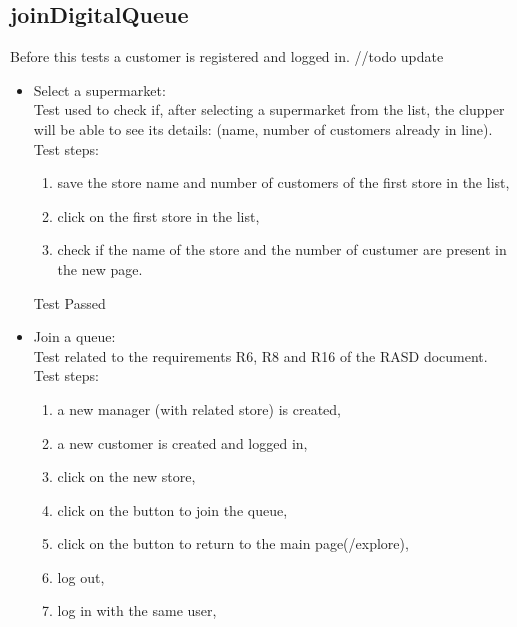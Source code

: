\subsection{joinDigitalQueue}

Before this tests a customer is registered and logged in.
//todo update
\begin{itemize}
    \item Select a supermarket: \\
    Test used to check if, after selecting a supermarket from the list, the clupper will be able to see its details: (name, number of customers already in line).\\
    Test steps:\\

    \begin{enumerate}
        \item save the store name and number of customers of the first store in the list,
        \item click on the first store in the list,
        \item check if the name of the store and the number of custumer are present in the new page.
    \end{enumerate}
    Test Passed

    \item Join a queue: \\
    Test related to the requirements R6, R8 and R16 of the RASD document. \\
    Test steps: \\
    \begin{enumerate}

        \item a new manager (with related store) is created,

        \item a new customer is created and logged in,

        \item click on the new store,

        \item click on the button to join the queue,

        \item click on the button to return to the main page(/explore),

        \item log out,

        \item log in with the same user,


\end{enumerate}
\end{itemize}

